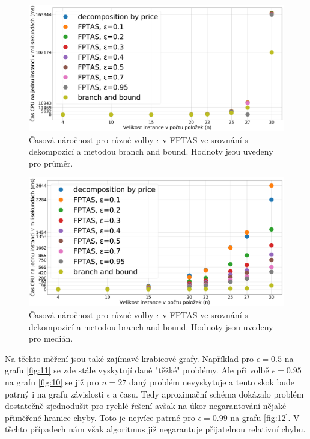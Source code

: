 \documentclass[11pt]{article}
\begin{document}
 \begin{figure}[h]\centering
	\includegraphics[scale=0.2]{img/FPTASavg}
 	\caption[2]{Časová náročnost pro různé volby $\epsilon$ v FPTAS ve srovnání s dekompozicí a metodou branch and bound. Hodnoty jsou uvedeny pro průměr.}\label{fig:8}
 \end{figure} 	
 \begin{figure}[h]\centering
	\includegraphics[scale=0.2]{img/FPTAS50}
 	\caption[2]{Časová náročnost pro různé volby $\epsilon$ v FPTAS ve srovnání s dekompozicí a metodou branch and bound. Hodnoty jsou uvedeny pro medián.}\label{fig:9}
 \end{figure} 	
 
Na těchto měření jsou také zajímavé krabicové grafy. Například pro $\epsilon=0.5$ na grafu \ref{fig:11} se zde stále vyskytují dané "těžké" problémy. Ale při volbě $\epsilon=0.95$ na grafu \ref{fig:10} se již pro $n=27$ daný problém nevyskytuje a tento skok bude patrný i na grafu závislosti $\epsilon$ a času. Tedy aproximační schéma dokázalo problém dostatečně zjednodušit pro rychlé řešení avšak na úkor negarantování nějaké přiměřené hranice chyby. Toto je nejvíce patrné pro $\epsilon=0.99$ na grafu \ref{fig:12}. V těchto případech nám však algoritmus již negarantuje přijatelnou relativní chybu.
 
\end{document}
